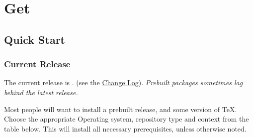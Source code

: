 \documentclass{article}
\begin{document}


\section{Get \LaTeXML}\label{get}
\def\GitHub{\href{https://github.com/}{GitHub}}
\def\MacPorts{\href{https://www.macports.org}{MacPorts}}
\def\MacTeX{\href{https://tug.org/mactex/}{MacTeX}}
\def\Chocolatey{\href{https://chocolatey.org}{Chocolatey}}
\def\MikTeX{\href{https://MiKTeX.org}{MikTeX}}


\subsection{Quick Start}\label{get.quick}
\subsubsection{Current Release}\label{get.current}
The current release is \textbf{\CurrentDownload}. (see the \href{Changes}{Change Log}).
\emph{Prebuilt packages sometimes lag behind the latest release.}

Most people will want to install a prebuilt release,
and some version of \TeX. Choose the appropriate
Operating system, repository type and context from the table below.
This will install all necessary prerequisites, unless otherwise noted.
\end{document}
